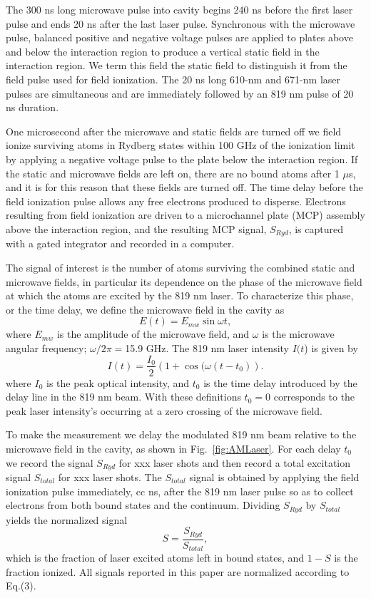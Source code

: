 \documentclass[aps,pra,preprint,groupedaddress]{revtex4-1}
\begin{document}
The 300 ns long microwave pulse into cavity begins 240 ns before the first laser pulse and ends 20 ns after the last laser pulse. Synchronous with the microwave pulse, balanced positive and negative voltage pulses are applied to plates above and below the interaction region to produce a vertical static field in the interaction region. We term this field the static field to distinguish it from the field pulse used for field ionization. The 20 ns long 610-nm and 671-nm laser pulses are simultaneous and are immediately followed by an 819 nm pulse of 20 ns duration.


One microsecond after the microwave and static fields are turned off we field ionize surviving atoms in Rydberg states within 100 GHz of the ionization limit by applying a negative voltage pulse to the plate below the interaction region. If the static and microwave fields are left on, there are no bound atoms after 1 $\mu$s, and it is for this reason that these fields are turned off. The time delay before the field ionization pulse allows any free electrons produced to disperse. Electrons resulting from field ionization are driven to a microchannel plate (MCP) assembly above the interaction region, and the resulting MCP signal, $S_{Ryd}$, is captured with a gated integrator and recorded in a computer.


The signal of interest is the number of atoms surviving the combined static and microwave fields, in particular its dependence on the phase of the microwave field at which the atoms are excited by the 819 nm laser.
To characterize this phase, or the time delay, we define the microwave field in the cavity as
\begin{equation}
E(t) =E_{mw}\sin{\omega t},
\end{equation}
where $E_{mw}$ is the amplitude of the microwave field, and $\omega$ is the microwave angular frequency; $\omega/2\pi=$15.9 GHz. The 819 nm laser intensity $I(t$) is given by
\begin{equation}
I(t) =\frac{I_0}{2}(1+\cos{(\omega (t-t_0)}).
\end{equation}
where $I_0$ is the peak optical intensity, and $t_0$ is the time delay introduced by the delay line in the 819 nm beam. With these definitions $t_0=0$ corresponds to the peak laser intensity's occurring at a zero crossing of the microwave field.


To make the measurement we delay the modulated 819 nm beam relative to the microwave field in the cavity, as shown in Fig.~\ref{fig:AMLaser}. For each delay $t_0$ we record the signal $S_{Ryd}$ for xxx laser shots and then record a total excitation signal $S_{total}$ for xxx laser shots. The $S_{total}$ signal is obtained by applying the field ionization pulse immediately, cc ns, after the 819 nm laser pulse so as to collect electrons from both bound states and the continuum. Dividing $S_{Ryd}$ by $S_{total}$ yields the normalized signal
\begin{equation}
S=\frac{S_{Ryd}}{S_{total}},
\end{equation}
which is the fraction of laser excited atoms left in bound states, and $1-S$ is the fraction ionized. All signals reported in this paper are normalized according to Eq.(3).
\end{document}
